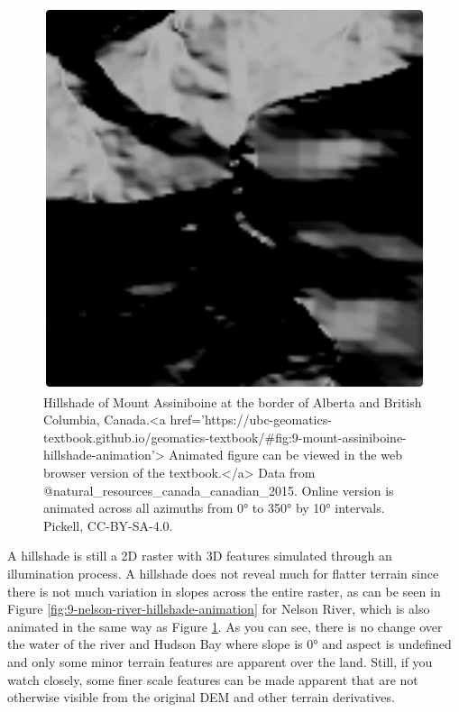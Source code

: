 \documentclass[
]{book}
\begin{document}
\begin{figure}
\includegraphics[width=0.75\linewidth]{images/09-mount-assiniboine-hillshade-animation} \caption{Hillshade of Mount Assiniboine at the border of Alberta and British Columbia, Canada.<a href='https://ubc-geomatics-textbook.github.io/geomatics-textbook/#fig:9-mount-assiniboine-hillshade-animation'> Animated figure can be viewed in the web browser version of the textbook.</a> Data from @natural_resources_canada_canadian_2015. Online version is animated across all azimuths from 0° to 350° by 10° intervals. Pickell, CC-BY-SA-4.0.}\label{fig:9-mount-assiniboine-hillshade-animation}
\end{figure}

A hillshade is still a 2D raster with 3D features simulated through an illumination process. A hillshade does not reveal much for flatter terrain since there is not much variation in slopes across the entire raster, as can be seen in Figure \ref{fig:9-nelson-river-hillshade-animation} for Nelson River, which is also animated in the same way as Figure \ref{fig:9-mount-assiniboine-hillshade-animation}. As you can see, there is no change over the water of the river and Hudson Bay where slope is 0° and aspect is undefined and only some minor terrain features are apparent over the land. Still, if you watch closely, some finer scale features can be made apparent that are not otherwise visible from the original DEM and other terrain derivatives.
\end{document}
